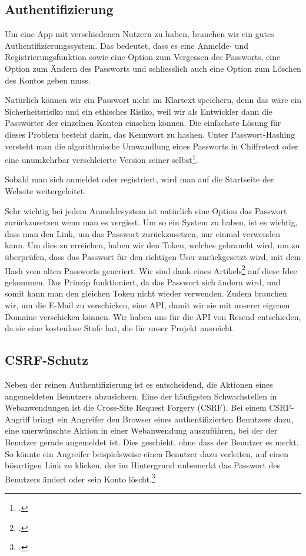 \documentclass[12pt,a4paper]{report}
\begin{document}
\subsection{Authentifizierung}
Um eine App mit verschiedenen Nutzern zu haben, brauchen wir ein gutes Authentifizierungssystem. Das bedeutet, dass es eine Anmelde- und Registrierungsfunktion sowie eine Option zum Vergessen des Passworts, eine Option zum Ändern des Passworts und schliesslich auch eine Option zum Löschen des Kontos geben muss. 

Natürlich können wir ein Passwort nicht im Klartext speichern, denn das wäre ein Sicherheitsrisiko und ein ethisches Risiko, weil wir als Entwickler dann die Passwörter der einzelnen Konten einsehen können. Die einfachste Lösung für dieses Problem besteht darin, das Kennwort zu hashen. Unter Passwort-Hashing versteht man die algorithmische Umwandlung eines Passworts in Chiffretext oder eine unumkehrbar verschleierte Version seiner selbst\footcite{password_hashing}. 

Sobald man sich anmeldet oder registriert, wird man auf die Startseite der Website weitergeleitet.

Sehr wichtig bei jedem Anmeldesystem ist natürlich eine Option das Passwort zurückzusetzen wenn man es vergisst. Um so ein System zu haben, ist es wichtig, dass man den Link, um das Passwort zurückzusetzen, nur einmal verwenden kann. Um dies zu erreichen, haben wir den Token, welches gebraucht wird, um zu überprüfen, dass das Passwort für den richtigen User zurückgesetzt wird, mit dem Hash vom alten Passworts generiert. Wir sind dank eines Artikels\footcite{password_reset} auf diese Idee gekommen. Das Prinzip funktioniert, da das Passwort sich ändern wird, und somit kann man den gleichen Token nicht wieder verwenden. Zudem brauchen wir, um die E-Mail zu verschicken, eine API, damit wir sie mit unserer eigenen Domaine verschicken können. Wir haben uns für die API von Resend entschieden, da sie eine kostenlose Stufe hat, die für unser Projekt ausreicht.


\subsection{CSRF-Schutz}
Neben der reinen Authentifizierung ist es entscheidend, die Aktionen eines angemeldeten Benutzers abzusichern. Eine der häufigsten Schwachstellen in Webanwendungen ist die Cross-Site Request Forgery (CSRF). Bei einem CSRF-Angriff bringt ein Angreifer den Browser eines authentifizierten Benutzers dazu, eine unerwünschte Aktion in einer Webanwendung auszuführen, bei der der Benutzer gerade angemeldet ist. Dies geschieht, ohne dass der Benutzer es merkt. So könnte ein Angreifer beispielsweise einen Benutzer dazu verleiten, auf einen bösartigen Link zu klicken, der im Hintergrund unbemerkt das Passwort des Benutzers ändert oder sein Konto löscht.\footcite{TestDriven_CSRF}
\end{document}
